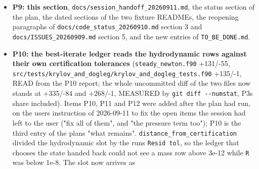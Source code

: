 \documentclass[english,a4paper]{my_memo}
\begin{document}
\begin{itemize}
  3.7\textquotesingle s \texttt{store\_row\_terms} item is struck through and marked RESOLVED by P4,
  and the resolved table gains D1, D2 and D3 with their measured before and
  after. Two test contract errors, both RED before and GREEN after:
  \texttt{steady\_selfconsistent\_residual} assertion 2 read "a hydrodynamic row above
  its tolerance implies \texttt{info\ =\ 2}", which conflates not certified with one
  flag and already failed on the entry text for any budget-limited log
  (\texttt{FAIL\ flag\_of\_carrier\_elem\_newton\ measured=info=1\ reference=info=2} -\textgreater{}
  PASS, with \texttt{wasp\_full\_newton} still PASS and a synthetic \texttt{info\ =\ 0} copy
  still FAILing); and \texttt{relaxation\_drift\_covers\_every\_element} built its
  column by swinging each metal mixing ratio about the reservoir on a fixed
  hydrogen fraction, so its species missed the density the column hands the
  operator by \textbf{1.66042E-02}, which is now \textbf{6.58484E-16} on a column of
  mass fractions that sum to one, the suite going 194/0 to \textbf{195/0} with a
  new row measuring the closure by the code\textquotesingle s own mass policy.
\item
  \textbf{P9: this section}, \texttt{docs/session\_handoff\_20260911.md}, the status section
  of the plan, the dated sections of the two fixture READMEs, the reopening
  paragraphs of \texttt{docs/code\_status\_20260910.md} section 3 and
  \texttt{docs/ISSUES\_20260909.md} section 5, and the new entries of
  \texttt{TO\_BE\_DONE.md}.
\item
  \textbf{P10: the best-iterate ledger reads the hydrodynamic rows against their own
  certification tolerances} (\texttt{steady\_newton.f90} +131/-55,
  \texttt{src/tests/krylov\_and\_dogleg/krylov\_and\_dogleg\_tests.f90} +135/-1, READ from
  the P10 report; the whole uncommitted diff of the two files now stands at
  +335/-84 and +268/-1, MEASURED by \texttt{git\ diff\ -\/-numstat}, P3\textquotesingle s share
  included). Items P10, P11 and P12 were added after the plan had run, on the
  user\textquotesingle s instruction of 2026-09-11 to fix the open items the session had left
  to the user ("fix all of them", and "the pressure term too"); P10 is the
  third entry of the plan\textquotesingle s "what remains".
  \texttt{distance\_from\_certification} divided the hydrodynamic slot by the run\textquotesingle s
  \texttt{Resid\ tol}, so the ledger that chooses the state handed back could not see
  a mass row above 3e-12 while \texttt{\textbar{}\textbar{}R\textbar{}\textbar{}} was below 1e-8. The slot now arrives as

\end{itemize}
\end{document}
